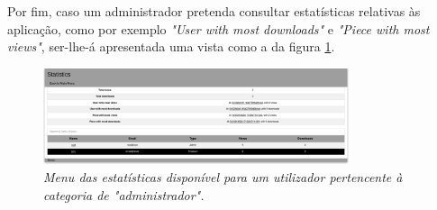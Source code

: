 Por fim, caso um administrador pretenda consultar estatísticas relativas às aplicação, como por exemplo \textit{"User with most downloads"} e \textit{"Piece with most views"}, ser-lhe-á apresentada uma vista como a da figura \ref{fig:statsMenu}.

\begin{figure}[H]
\begin{center}
    \includegraphics[width = 0.8\textwidth, keepaspectratio]{imgs/statisticsMenu.png}
    \caption{\textit{Menu das estatísticas disponível para um utilizador pertencente à categoria de "administrador".}}
    \label{fig:statsMenu}
\end{center}
\end{figure}